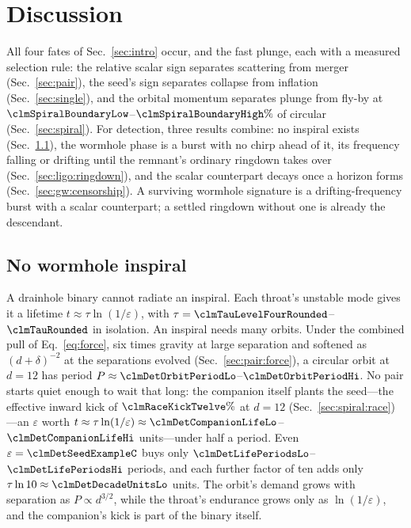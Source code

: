 \documentclass[twocolumn,floatfix,aps,prd,superscriptaddress,nofootinbib]{revtex4-2}
\begin{document}
\section{Discussion}
\label{sec:discussion}

All four fates of Sec.~\ref{sec:intro} occur, and the fast plunge, each with a measured selection rule: the relative scalar sign separates scattering from merger (Sec.~\ref{sec:pair}), the seed's sign separates collapse from inflation (Sec.~\ref{sec:single}), and the orbital momentum separates plunge from fly-by at $\clmSpiralBoundaryLow$--$\clmSpiralBoundaryHigh\%$ of circular (Sec.~\ref{sec:spiral}). For detection, three results combine: no inspiral exists (Sec.~\ref{sec:discussion:noinspiral}), the wormhole phase is a burst with no chirp ahead of it, its frequency falling or drifting until the remnant's ordinary ringdown takes over (Sec.~\ref{sec:ligo:ringdown}), and the scalar counterpart decays once a horizon forms (Sec.~\ref{sec:gw:censorship}). A surviving wormhole signature is a drifting-frequency burst with a scalar counterpart; a settled ringdown without one is already the descendant.

\subsection{No wormhole inspiral}
\label{sec:discussion:noinspiral}

A drainhole binary cannot radiate an inspiral. Each throat's unstable mode gives it a lifetime $t\approx\tau\ln(1/\varepsilon)$, with $\tau=\clmTauLevelFourRounded$--$\clmTauRounded$ in isolation. An inspiral needs many orbits. Under the combined pull of Eq.~\eqref{eq:force}, six times gravity at large separation and softened as $(d+\delta)^{-2}$ at the separations evolved (Sec.~\ref{sec:pair:force}), a circular orbit at $d=12$ has period $P\approx\clmDetOrbitPeriodLo$--$\clmDetOrbitPeriodHi$. No pair starts quiet enough to wait that long: the companion itself plants the seed---the effective inward kick of $\clmRaceKickTwelve\%$ at $d=12$ (Sec.~\ref{sec:spiral:race})---an $\varepsilon$ worth $t\approx\tau\ln(1/\varepsilon)\approx\clmDetCompanionLifeLo$--$\clmDetCompanionLifeHi$ units---under half a period. Even $\varepsilon=\clmDetSeedExampleC$ buys only $\clmDetLifePeriodsLo$--$\clmDetLifePeriodsHi$ periods, and each further factor of ten adds only $\tau\ln10\approx\clmDetDecadeUnitsLo$ units. The orbit's demand grows with separation as $P\propto d^{3/2}$, while the throat's endurance grows only as $\ln(1/\varepsilon)$, and the companion's kick is part of the binary itself.
\end{document}
